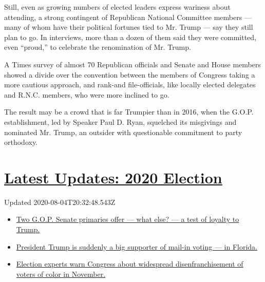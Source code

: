 Still, even as growing numbers of elected leaders express wariness about
attending, a strong contingent of Republican National Committee members
--- many of whom have their political fortunes tied to Mr. Trump --- say
they still plan to go. In interviews, more than a dozen of them said
they were committed, even ``proud,'' to celebrate the renomination of
Mr. Trump.

A Times survey of almost 70 Republican officials and Senate and House
members showed a divide over the convention between the members of
Congress taking a more cautious approach, and rank-and file-officials,
like locally elected delegates and R.N.C. members, who were more
inclined to go.

The result may be a crowd that is far Trumpier than in 2016, when the
G.O.P. establishment, led by Speaker Paul D. Ryan, squelched its
misgivings and nominated Mr. Trump, an outsider with questionable
commitment to party orthodoxy.

\hypertarget{latest-updates-2020-election}{%
\section{\texorpdfstring{\href{https://www.nytimes.com/2020/08/04/us/elections/primary-election-michigan-arizona-kansas.html?action=click\&pgtype=Article\&state=default\&region=MAIN_CONTENT_1\&context=storylines_live_updates}{Latest
Updates: 2020
Election}}{Latest Updates: 2020 Election}}\label{latest-updates-2020-election}}

Updated 2020-08-04T20:32:48.543Z

\begin{itemize}
\tightlist
\item
  \href{https://www.nytimes.com/2020/08/04/us/elections/primary-election-michigan-arizona-kansas.html?action=click\&pgtype=Article\&state=default\&region=MAIN_CONTENT_1\&context=storylines_live_updates\#link-3924dd44}{Two
  G.O.P. Senate primaries offer --- what else? --- a test of loyalty to
  Trump.}
\item
  \href{https://www.nytimes.com/2020/08/04/us/elections/primary-election-michigan-arizona-kansas.html?action=click\&pgtype=Article\&state=default\&region=MAIN_CONTENT_1\&context=storylines_live_updates\#link-32b39e33}{President
  Trump is suddenly a big supporter of mail-in voting --- in Florida.}
\item
  \href{https://www.nytimes.com/2020/08/04/us/elections/primary-election-michigan-arizona-kansas.html?action=click\&pgtype=Article\&state=default\&region=MAIN_CONTENT_1\&context=storylines_live_updates\#link-6d019753}{Election
  experts warn Congress about widespread disenfranchisement of voters of
  color in November.}
\end{itemize}

